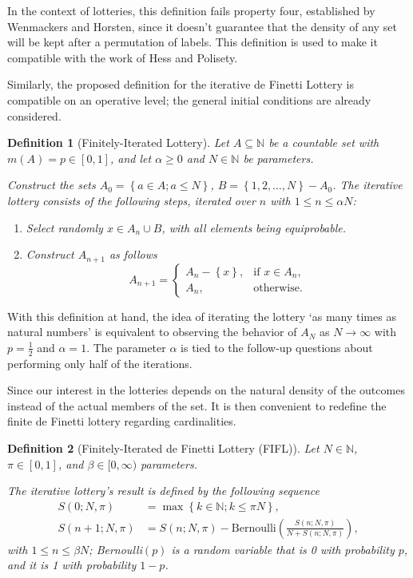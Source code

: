\documentclass{article}
\newtheorem{definition}{Definition}
\newcommand{\N}{\mathbb{N}}
\newcommand{\sset}[1]{\left\{ #1 \right\}}
\newcommand{\ppar}[1]{\left( #1 \right)}
\begin{document}
In the context of lotteries, this definition fails property four, established by Wenmackers and Horsten, since it doesn't guarantee that the density of any set will be kept after a permutation of labels.
%
This definition is used to make it compatible with the work of Hess and Polisety.

Similarly, the proposed definition for the iterative de Finetti Lottery is compatible on an operative level; the general initial conditions are already considered.

\begin{definition}[Finitely-Iterated Lottery]
Let $A \subseteq \N$ be a countable set with $m\ppar{A} = p \in [0,1]$, and let $\alpha\geq 0$ and $N\in \N$ be parameters. 

Construct the sets $A_0 = \sset{a\in A; a\leq N}$, $B = \sset{1, 2, \dots, N} - A_0$.
%
The iterative lottery consists of the following steps, iterated over $n$ with $1\leq n\leq \alpha N$:
\begin{enumerate}
    \item Select randomly $x \in A_n \cup B$, with all elements being equiprobable.
    \item Construct $A_{n+1}$ as follows
    \begin{equation}
        A_{n+1} = \begin{cases}
            A_n-\sset{x}, &\text{if } x\in A_n, \\
            A_n, &\text{otherwise}.
        \end{cases}
    \end{equation}
\end{enumerate}
\end{definition}

With this definition at hand, the idea of iterating the lottery `as many times as natural numbers' is equivalent to observing the behavior of $A_{N}$ as $N \rightarrow \infty$ with $p=\frac{1}{2}$ and $\alpha=1$.
%
The parameter $\alpha$ is tied to the follow-up questions about performing only half of the iterations.


Since our interest in the lotteries depends on the natural density of the outcomes instead of the actual members of the set.
%
It is then convenient to redefine the finite de Finetti lottery regarding cardinalities.

\begin{definition}[Finitely-Iterated de Finetti Lottery (FIFL)]
Let $N\in \N$, $\pi \in [0,1]$, and $\beta \in [0, \infty)$ parameters.

The iterative lottery's result is defined by the following sequence
\begin{align}
    S\ppar{0; N, \pi} &= \max\sset{k\in \N; k \leq \pi N}, \\
    S\ppar{n+1; N, \pi} &= S\ppar{n; N, \pi} - \text{Bernoulli}\ppar{\frac{S\ppar{n; N, \pi}}{N+S\ppar{n; N, \pi}}},
\end{align}
with $1\leq n\leq \beta N$; Bernoulli$\ppar{p}$ is a random variable that is 0 with probability $p$, and it is 1 with probability $1-p$.
\end{definition}
\end{document}

